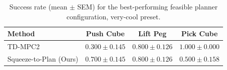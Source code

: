 \begin{table}[t]
\centering
\begin{tabular}{lccc}
\toprule
Method & Push Cube & Lift Peg & Pick Cube \\
\midrule
TD-MPC2 & $0.300 \pm 0.145$ & $0.800 \pm 0.126$ & $1.000 \pm 0.000$ \\
Squeeze-to-Plan (Ours) & $0.700 \pm 0.145$ & $0.800 \pm 0.126$ & $0.500 \pm 0.158$ \\
\bottomrule
\end{tabular}
\caption{Success rate (mean $\pm$ SEM) for the best-performing feasible planner configuration, very-cool preset.}
\label{tab:latency_vs_success_rate_very-cool}
\end{table}
